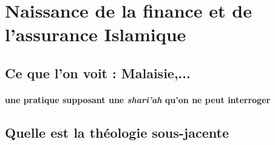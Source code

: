 \section{Naissance de la finance et de l'assurance Islamique}

\subsection{Ce que l'on voit : Malaisie,...} 

\paragraph{une pratique supposant une \textit{shari'ah} qu'on ne peut interroger}

\subsection{Quelle est la théologie sous-jacente}